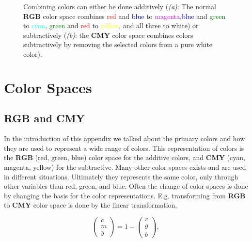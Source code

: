 \begin{figure}[H]
    \centering
    \captionsetup[subfigure]{justification=centering}
    \begin{subfigure}[b]{0.49\textwidth}
        \centering
        
		\caption{}
		\label{fig:color_additive}
    \end{subfigure}
    \begin{subfigure}[b]{0.49\textwidth}
        \centering
        
		\caption{}
		\label{fig:color_subtractive}
    \end{subfigure}
    \caption{Combining colors can either be done additively  (\textit{(a)}: The normal \textbf{RGB} color space combines \textcolor{red}{red} and \textcolor{blue}{blue} to \textcolor{magenta}{magenta},\textcolor{blue}{blue} and \textcolor{green}{green} to \textcolor{cyan}{cyan}, \textcolor{green}{green} and \textcolor{red}{red} to \textcolor{yellow}{yellow}, and all three to white) or subtractively (\textit{(b)}: the \textbf{CMY} color space combines colors subtractively by removing the selected colors from a pure white color).}
    \label{fig:color_arithmetic}
\end{figure}


\section{Color Spaces}

\subsection{\textbf{RGB} and \textbf{CMY}}

In the introduction of this appendix we talked about the primary colors and how they are used to represent a wide range of colors. This representation of colors is the \textbf{RGB} (red, green, blue) color space for the additive colors, and \textbf{CMY} (cyan, magenta, yellow) for the subtractive. Many other color spaces exists and are used in different situations. Ultimately they represents the same color, only through other variables than red, green, and blue. Often the change of color spaces is done by changing the basis for the color representations. E.g. transforming from \textbf{RGB} to \textbf{CMY} color space is done by the linear transformation,

\begin{equation}
\left(\begin{array}{c}
c \\ m \\ y
\end{array}\right) = 1- \left(\begin{array}{c}
r \\ g \\ b
\end{array}\right),
\end{equation}

